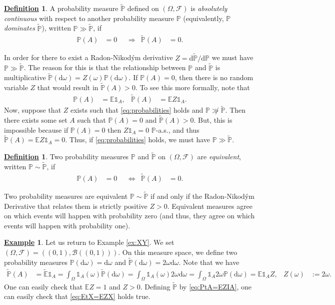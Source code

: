 \documentclass[12pt]{book}
\numberwithin{equation}{chapter}
\theoremstyle{plain}
\numberwithin{theorem}{section}
\theoremstyle{definition}
\newtheorem{definition}[theorem]{\underline{Definition}}
\newtheorem{example}[theorem]{\underline{Example}}
\numberwithin{exercise}{chapter}
\newcommand{\<}{\langle}
\renewcommand{\>}{\rangle}
\renewcommand{\(}{\left(}
\renewcommand{\)}{\right)}
\renewcommand{\[}{\left[}
\renewcommand{\]}{\right]}
\newcommand\Eb{\mathds{E}}
\newcommand\Ib{\mathds{1}} 	%
\newcommand\Pb{\mathds{P}}
\newcommand\Bc{\mathscr{B}}
\newcommand\Fc{\mathscr{F}}
\newcommand\om{\omega}
\newcommand\Om{\Omega}
\newcommand\Ebt{\widetilde{\Eb}}
\newcommand\Pbt{\widetilde{\Pb}}
\newcommand\dd{\mathrm{d}}
\begin{document}
\begin{definition}
A probability measure $\Pbt$ defined on $(\Om,\Fc)$ is \emph{absolutely continuous} with respect to another probability measure $\Pb$ (equivalently, $\Pb$ \emph{dominates} $\Pbt$), written $\Pb \gg \Pbt$, if
\begin{align}
\Pb(A) 
	&= 0 &
	&\Rightarrow& 
\Pbt(A) 
	&= 0.
\end{align}
\end{definition}

\noindent
In order for there to exist a Radon-Nikod\'ym derivative $Z = \dd \Pbt / \dd \Pb$ we must have $\Pb \gg \Pbt$.
The reason for this is that the relationship between $\Pb$ and $\Pbt$ is multiplicative $\Pbt(\dd \om) = Z(\om) \Pb(\dd \om)$.
If $\Pb(A) = 0$, then there is no random variable $Z$ that would result in $\Pbt(A) > 0$.
To see this more formally, note that
\begin{align}
\Pb(A)
	&=	\Eb \Ib_A , &
\Pbt(A)
	&=	\Eb Z \Ib_A . \label{eq:probabilities}
\end{align}
Now, suppose that $Z$ exists such that \eqref{eq:probabilities} holds and $\Pb \not\gg \Pbt$.
Then there exists some set $A$ such that $\Pb(A) = 0$ and $\Pbt(A) > 0$.
But, this is impossible because if $\Pb(A) = 0$ then $Z \Ib_A = 0$ $\Pb$-a.s., and thus $\Pbt(A) = \Eb Z \Ib_A = 0$.
Thus, if \eqref{eq:probabilities} holds, we must have $\Pb \gg \Pbt$.

\begin{definition}
Two probability measures $\Pb$ and $\Pbt$ on $(\Om,\Fc)$ are \emph{equivalent}, written $\Pb \sim \Pbt$, if 
\begin{align}
\Pb(A) 
	&= 0 &
	&\Leftrightarrow& 
\Pbt(A) 
	&= 0 .
\end{align}
\end{definition}

\noindent
Two probability measures are equivalent $\Pb \sim \Pbt$ if and only if the Radon-Nikod\'ym Derivative that relates them is strictly positive $Z > 0$.
Equivalent measures agree on which events will happen with probability zero (and thus, they agree on which events will happen with probability one).

\begin{example}
Let us return to Example \ref{ex:XY}. We set $(\Om, \Fc) = ((0,1),\Bc((0,1)))$.  On this measure space, we define two probability measures $\Pb(\dd \om) = \dd \om$ and $\Pbt(\dd \om) = 2 \om \dd \om$.  Note that we have
\begin{align}
\Pbt(A)
	&=	\Ebt \Ib_A
	=		\int_\Om \Ib_A(\om) \Pbt(\dd \om)
	=		\int_\Om \Ib_A(\om) 2 \om \dd \om 
	=		\int_\Om \Ib_A 2 \om \Pb(\dd \om)
	=		\Eb \Ib_A Z , &
Z(\om)
	&:=	2 \om .
\end{align}
One can easily check that $\Eb Z = 1$ and $Z>0$.  Defining $\Pbt$ by \eqref{eq:PtA=EZIA}, one can easily check that \eqref{eq:EtX=EZX} holds true.
\end{example}
\end{document}
